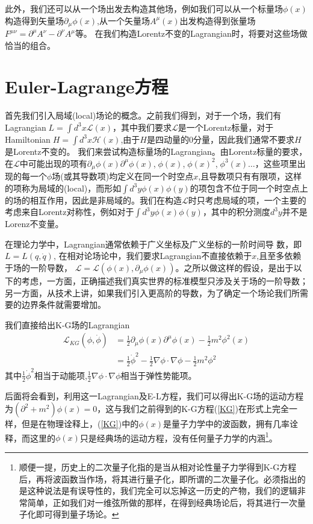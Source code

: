 此外，我们还可以从一个场出发去构造其他场，例如我们可以从一个标量场$\phi(x)$构造得到矢量场$\partial_{\mu}\phi(x) $,从一个矢量场$A^{\mu}(x)$出发构造得到张量场$F^{\mu\nu}=\partial^{\mu}A^{\nu}-\partial^{\nu}A^{\mu}$等。
在我们构造Lorentz不变的Lagrangian时，将要对这些场做恰当的组合。
\section{Euler-Lagrange方程}
首先我们引入局域(local)场论的概念。之前我们得到，对于一个场，我们有Lagrangian$\;L=\int d^{3}x\mathcal{L}(x)$，其中我们要求$\mathcal{L}$是一个Lorentz标量，对于Hamiltonian$\;H=\int d^{3}x\mathcal{H}(x)$,由于$H$是四动量的0分量，因此我们通常不要求$H$是Lorentz不变的。
我们来尝试构造标量场的Lagrangian。由Lorentz标量的要求，在$\mathcal{L}$中可能出现的项有$\partial_{\mu}\phi(x)\partial^{\mu}\phi(x)$,$\;\phi(x)$,$\;\phi(x)^{2}$,$\;\phi^{3}(x)\dots$，这些项里出现的每一个$\phi$场(或其导数项)均定义在同一个时空点$x$,且导数项只有有限项，这样的项称为局域的(local)，而形如$\int d^{3}y \phi(x)\phi(y)$的项包含不位于同一个时空点上的场的相互作用，因此是非局域的。我们在构造$\mathcal{L}$时只考虑局域的项，一个主要的考虑来自Lorentz对称性，例如对于$\int d^{3}y \phi(x)\phi(y)$，其中的积分测度$d^{3}y$并不是Lorenz不变量。

在理论力学中，Lagrangian通常依赖于广义坐标及广义坐标的一阶时间导
数，即$L=L(q,\dot{q})$,
在相对论场论中，我们要求Lagrangian不直接依赖于$x$,且至多依赖于场的一阶导数，
$\mathcal{L}=\mathcal{L}(\phi(x),\partial_{\mu}\phi(x))$。之所以做这样的假设，是出于以下的考虑，一方面，正确描述我们真实世界的标准模型只涉及关于场的一阶导数；另一方面，从技术上讲，如果我们引入更高阶的导数，为了确定一个场论我们所需要的边界条件就需要增加。

我们直接给出K-G场的Lagrangian
\begin{equation}
\label{lagrangian-KG}
\begin{aligned}
    \mathcal{L}_{KG}(\phi,\dot{\phi})&=\frac{1}{2}\partial_{\mu}\phi(x)\partial^{\mu}\phi(x)-\frac{1}{2}m^{2}\phi^{2}(x)\\
    &=\frac{1}{2}\dot{\phi}^{2}-\frac{1}{2}\nabla\phi\cdot\nabla\phi-\frac{1}{2}m^{2}\phi^{2}
\end{aligned}
\end{equation}
其中$\frac{1}{2}\dot{\phi}^{2}$相当于动能项,$\frac{1}{2}\nabla\phi\cdot\nabla\phi$相当于弹性势能项。

后面将会看到，利用这一Lagrangian及E-L方程，我们可以得出K-G场的运动方程为$(\partial^{2}+m^2)\phi(x)=0$，这与我们之前得到的K-G方程(\ref{KG})在形式上完全一样，但是在物理诠释上，(\ref{KG})中的$\phi(x)$是量子力学中的波函数，拥有几率诠释，而这里的$\phi(x)$只是经典场的运动方程，没有任何量子力学的内涵\footnote{顺便一提，历史上的二次量子化指的是当从相对论性量子力学得到K-G方程后，再将波函数当作场，将其进行量子化，即所谓的二次量子化。必须指出的是这种说法是有误导性的，我们完全可以忘掉这一历史的产物，我们的逻辑非常简单，正如我们对一维弦所做的那样，在得到经典场论后，将其进行一次量子化即可得到量子场论。}。

